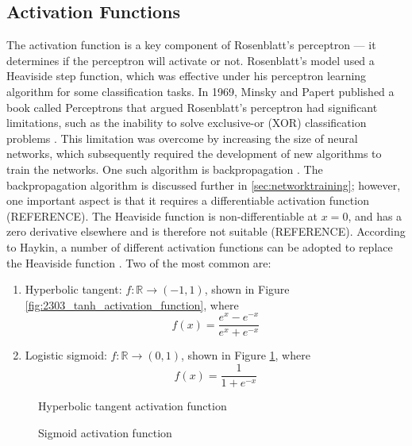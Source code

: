 
\subsection{Activation Functions}
The activation function is a key component of Rosenblatt's perceptron --- it determines if the perceptron will activate or not. Rosenblatt's model used a Heaviside step function, which was effective under his perceptron learning algorithm for some classification tasks. In 1969, Minsky and Papert published a book called Perceptrons that argued Rosenblatt's perceptron had significant limitations, such as the inability to solve exclusive-or (XOR) classification problems \cite{Minsky1969}. This limitation was overcome by increasing the size of neural networks, which subsequently required the development of new algorithms to train the networks. One such algorithm is backpropagation \cite{Werbos1982}. The backpropagation algorithm is discussed further in \textsection \ref{sec:networktraining}; however, one important aspect is that it requires a differentiable activation function (REFERENCE). The Heaviside function is non-differentiable at $x = 0$, and has a zero derivative elsewhere and is therefore not suitable (REFERENCE). According to Haykin, a number of different activation functions can be adopted to replace the Heaviside function \cite{Haykin99}. Two of the most common are:
\begin{enumerate}
	\item Hyperbolic tangent: $f:\mathbb{R} \to (-1,1)$, shown in Figure \ref{fig:2303_tanh_activation_function}, where
	\begin{equation}
		f(x) = \frac{e^x - e^{-x}}{e^x + e^{-x}}
	\end{equation}
	\item Logistic sigmoid: $f:\mathbb{R} \to (0,1)$, shown in Figure \ref{fig:2304_sigmoid_activation_function}, where
	\begin{equation}
		f(x) = \frac{1}{1 + e^{-x}}
	\end{equation}
\end{enumerate}

\begin{figure}[h]
	\centering
	\begin{minipage}[t]{0.45\textwidth}
		\centering
		
		\caption[Hyperbolic tangent activation function]{Hyperbolic tangent activation function}
		\label{fig:2303_tanh_activation_function}
	\end{minipage}
	\hspace{1cm}
	\begin{minipage}[t]{0.45\textwidth}
		\centering
		
		\caption[Sigmoid activation function]{Sigmoid activation function}
		\label{fig:2304_sigmoid_activation_function}
	\end{minipage}
\end{figure}

